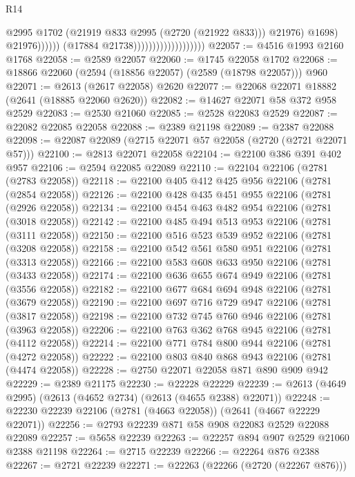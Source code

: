 \begin{lexlean}{R14}
\begin{coremodule}
                                                        @2995
                                                        @1702
                                                        (@21919 @833 @2995 (@2720 (@21922 @833)))
                                                        @21976)
                                                      @1698)
                                                    @21976))))))
                                        (@17884 @21738)))))))))))))))))))
@22057 := @4516 @1993 @2160 @1768
@22058 := @2589 @22057
@22060 := @1745 @22058 @1702
@22068 := @18866 @22060 (@2594 (@18856 @22057) (@2589 (@18798 @22057))) @960
@22071 := @2613 (@2617 @22058) @2620
@22077 := @22068 @22071 @18882 (@2641 (@18885 @22060 @2620))
@22082 := @14627 @22071 @58 @372 @958 @2529
@22083 := @2530 @21060
@22085 := @2528 @22083 @2529
@22087 := @22082 @22085 @22058
@22088 := @2389 @21198
@22089 := @2387 @22088
@22098 := @22087 @22089 (@2715 @22071 @57 @22058 (@2720 (@2721 @22071 @57)))
@22100 := @2813 @22071 @22058
@22104 := @22100 @386 @391 @402 @957
@22106 := @2594 @22085 @22089
@22110 := @22104 @22106 (@2781 (@2783 @22058))
@22118 := @22100 @405 @412 @425 @956 @22106 (@2781 (@2854 @22058))
@22126 := @22100 @428 @435 @451 @955 @22106 (@2781 (@2926 @22058))
@22134 := @22100 @454 @463 @482 @954 @22106 (@2781 (@3018 @22058))
@22142 := @22100 @485 @494 @513 @953 @22106 (@2781 (@3111 @22058))
@22150 := @22100 @516 @523 @539 @952 @22106 (@2781 (@3208 @22058))
@22158 := @22100 @542 @561 @580 @951 @22106 (@2781 (@3313 @22058))
@22166 := @22100 @583 @608 @633 @950 @22106 (@2781 (@3433 @22058))
@22174 := @22100 @636 @655 @674 @949 @22106 (@2781 (@3556 @22058))
@22182 := @22100 @677 @684 @694 @948 @22106 (@2781 (@3679 @22058))
@22190 := @22100 @697 @716 @729 @947 @22106 (@2781 (@3817 @22058))
@22198 := @22100 @732 @745 @760 @946 @22106 (@2781 (@3963 @22058))
@22206 := @22100 @763 @362 @768 @945 @22106 (@2781 (@4112 @22058))
@22214 := @22100 @771 @784 @800 @944 @22106 (@2781 (@4272 @22058))
@22222 := @22100 @803 @840 @868 @943 @22106 (@2781 (@4474 @22058))
@22228 := @2750 @22071 @22058 @871 @890 @909 @942
@22229 := @2389 @21175
@22230 := @22228 @22229
@22239 := @2613 (@4649 @2995) (@2613 (@4652 @2734) (@2613 (@4655 @2388) @22071))
@22248 := @22230 @22239 @22106 (@2781 (@4663 @22058)) (@2641 (@4667 @22229 @22071))
@22256 := @2793 @22239 @871 @58 @908 @22083 @2529 @22088 @22089
@22257 := @5658 @22239
@22263 := @22257 @894 @907 @2529 @21060 @2388 @21198
@22264 := @2715 @22239
@22266 := @22264 @876 @2388
@22267 := @2721 @22239
@22271 := @22263 (@22266 (@2720 (@22267 @876)))

\end{coremodule}
\end{lexlean}
